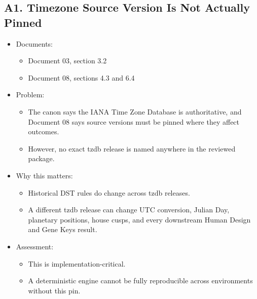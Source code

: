 \documentclass[11pt]{article}
\begin{document}
\subsection{A1. Timezone Source Version Is Not Actually Pinned}
\label{sec:orga2b70bb}
\begin{itemize}
\item Documents:
\begin{itemize}
\item Document 03, section 3.2
\item Document 08, sections 4.3 and 6.4
\end{itemize}
\item Problem:
\begin{itemize}
\item The canon says the IANA Time Zone Database is authoritative, and Document 08 says source versions must be pinned where they affect outcomes.
\item However, no exact tzdb release is named anywhere in the reviewed package.
\end{itemize}
\item Why this matters:
\begin{itemize}
\item Historical DST rules do change across tzdb releases.
\item A different tzdb release can change UTC conversion, Julian Day, planetary positions, house cusps, and every downstream Human Design and Gene Keys result.
\end{itemize}
\item Assessment:
\begin{itemize}
\item This is implementation-critical.
\item A deterministic engine cannot be fully reproducible across environments without this pin.
\end{itemize}
\end{itemize}
\end{document}
